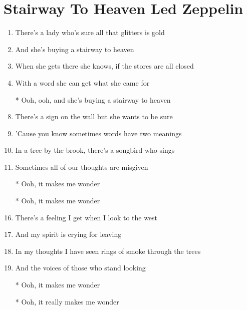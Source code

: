 \documentclass{article}
\begin{document}
    \section*{Stairway To Heaven \of  Led Zeppelin}

    \begin{center}
        \begin{enumerate}
            \item There's a lady who's sure all that glitters is gold
            \item And she's buying a stairway to heaven
            \item When she gets there she knows, if the stores are all closed
            \item With a word she can get what she came for

            \item[]
            \item[*] Ooh, ooh, and she's buying a stairway to heaven
            \item[]

            \item There's a sign on the wall but she wants to be sure
            \item 'Cause you know sometimes words have two meanings
            \item In a tree by the brook, there's a songbird who sings
            \item Sometimes all of our thoughts are misgiven

            \item[]
            \item[*] Ooh, it makes me wonder
            \item[*] Ooh, it makes me wonder
            \item[] 

            \item There's a feeling I get when I look to the west
            \item And my spirit is crying for leaving
            \item In my thoughts I have seen rings of smoke through the trees
            \item And the voices of those who stand looking

            \item[]
            \item[*] Ooh, it makes me wonder
            \item[*] Ooh, it really makes me wonder
            \item[] 


\end{enumerate}
\end{center}
\end{document}
